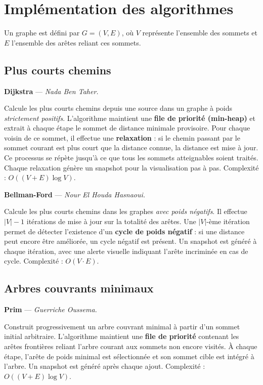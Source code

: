 \documentclass[a4paper,12pt]{report}
\begin{document}
 

\section{Implémentation des algorithmes}

Un graphe est défini par $G = (V, E)$, où $V$ représente l'ensemble des sommets et $E$ l'ensemble des arêtes reliant ces sommets.

\subsection{Plus courts chemins}

\textbf{Dijkstra} — \textit{Nada Ben Taher.}

Calcule les plus courts chemins depuis une source dans un graphe à poids \emph{strictement positifs}.
L'algorithme maintient une \textbf{file de priorité (min-heap)} et extrait à chaque étape le sommet
de distance minimale provisoire. Pour chaque voisin de ce sommet, il effectue une \textbf{relaxation} :
si le chemin passant par le sommet courant est plus court que la distance connue, la distance est mise
à jour. Ce processus se répète jusqu'à ce que tous les sommets atteignables soient traités. Chaque
relaxation génère un snapshot pour la visualisation pas à pas. Complexité : $O((V+E)\log V)$.

\medskip
\textbf{Bellman-Ford} — \textit{Nour El Houda Hasnaoui.}

Calcule les plus courts chemins dans les graphes \emph{avec poids négatifs}. Il effectue $|V|-1$
itérations de mise à jour sur la totalité des arêtes. Une $|V|$-ème itération permet de détecter
l'existence d'un \textbf{cycle de poids négatif} : si une distance peut encore être améliorée, un
cycle négatif est présent. Un snapshot est généré à chaque itération, avec une alerte visuelle
indiquant l'arête incriminée en cas de cycle. Complexité : $O(V \cdot E)$.
 
\subsection{Arbres couvrants minimaux}

\textbf{Prim} — \textit{Guerriche Oussema.}

Construit progressivement un arbre couvrant minimal à partir d'un sommet initial arbitraire.
L'algorithme maintient une \textbf{file de priorité} contenant les arêtes frontières reliant
l'arbre courant aux sommets non encore visités. À chaque étape, l'arête de poids minimal est
sélectionnée et son sommet cible est intégré à l'arbre. Un snapshot est généré après chaque
ajout. Complexité : $O((V+E)\log V)$.
\end{document}
